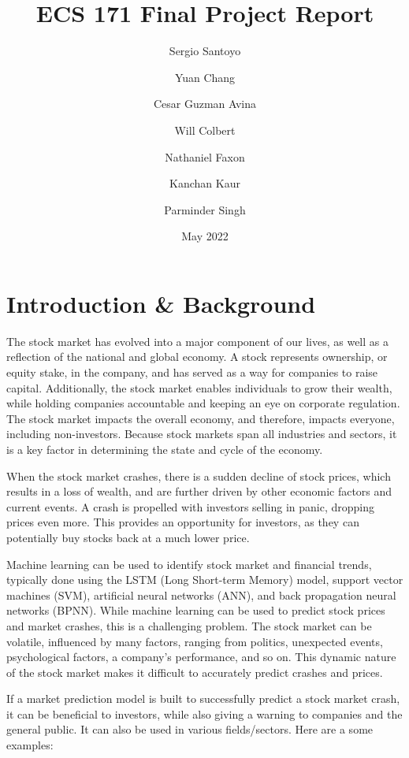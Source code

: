 \documentclass{article}
\title{ECS 171 Final Project Report}
\author{
  Sergio Santoyo\\
  \and
  Yuan Chang\\
  \and
  Cesar Guzman Avina\\
  \and
  Will Colbert\\
  \and
  Nathaniel Faxon\\
  \and
  Kanchan Kaur\\
  \and
  Parminder Singh\\
}
\date{May 2022}
\begin{document}
\maketitle
\section{Introduction \& Background}
The stock market has evolved into a major component of our lives, as well as a reflection of the national and global economy. A stock represents ownership, or equity stake, in the company, and has served as a way for companies to raise capital. Additionally, the stock market enables individuals to grow their wealth, while holding companies accountable and keeping an eye on corporate regulation. The stock market impacts the overall economy, and therefore, impacts everyone, including non-investors. Because stock markets span all industries and sectors, it is a key factor in determining the state and cycle of the economy.

When the stock market crashes, there is a sudden decline of stock prices, which results in a loss of wealth, and are further driven by other economic factors and current events. A crash is propelled with investors selling in panic, dropping prices even more. This provides an opportunity for investors, as they can potentially buy stocks back at a much lower price.

Machine learning can be used to identify stock market and financial trends, typically done using the LSTM (Long Short-term Memory) model, support vector machines (SVM), artificial neural networks (ANN), and back propagation neural networks (BPNN). While machine learning can be used to predict stock prices and market crashes, this is a challenging problem. The stock market can be volatile, influenced by many factors, ranging from politics, unexpected events, psychological factors, a company’s performance, and so on. This dynamic nature of the stock market makes it difficult to accurately predict crashes and prices.

If a market prediction model is built to successfully predict a stock market crash, it can be beneficial to investors, while also giving a warning to companies and the general public. It can also be used in various fields/sectors. Here are a some examples: 
\end{document}
